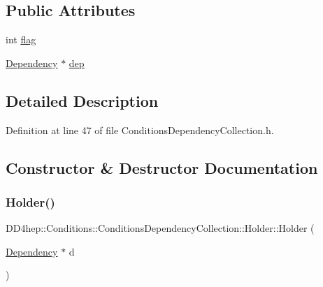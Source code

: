 \subsection*{Public Attributes}
\begin{DoxyCompactItemize}
\item 
int \hyperlink{struct_d_d4hep_1_1_conditions_1_1_conditions_dependency_collection_1_1_holder_a0e505e33fbee2f24378e55527d99c6d3}{flag}
\item 
\hyperlink{class_d_d4hep_1_1_conditions_1_1_conditions_dependency_collection_a87252585d3e17ae82813c039b1b47e8a}{Dependency} $\ast$ \hyperlink{struct_d_d4hep_1_1_conditions_1_1_conditions_dependency_collection_1_1_holder_a958102c9c47e86d3f479021dd1e570f6}{dep}
\end{DoxyCompactItemize}


\subsection{Detailed Description}


Definition at line 47 of file Conditions\+Dependency\+Collection.\+h.



\subsection{Constructor \& Destructor Documentation}
\hypertarget{struct_d_d4hep_1_1_conditions_1_1_conditions_dependency_collection_1_1_holder_a2eb63a4f316a695d951a31ef4d230fee}{}\label{struct_d_d4hep_1_1_conditions_1_1_conditions_dependency_collection_1_1_holder_a2eb63a4f316a695d951a31ef4d230fee} 
\subsubsection{\texorpdfstring{Holder()}{Holder()}}
{\footnotesize\ttfamily D\+D4hep\+::\+Conditions\+::\+Conditions\+Dependency\+Collection\+::\+Holder\+::\+Holder (\begin{DoxyParamCaption}\item[{\hyperlink{class_d_d4hep_1_1_conditions_1_1_conditions_dependency_collection_a87252585d3e17ae82813c039b1b47e8a}{Dependency} $\ast$}]{d }\end{DoxyParamCaption})\hspace{0.3cm}{\ttfamily [inline]}}



